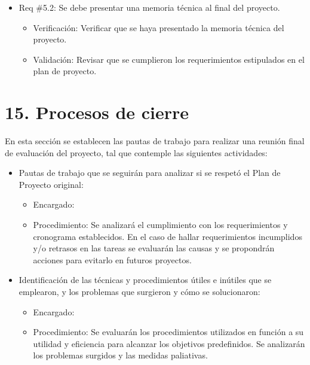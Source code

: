 \documentclass[
11pt, %
]{charter}
\begin{document}
\begin{itemize} 
\item Req \#5.2: Se debe presentar una memoria técnica al final del proyecto.
\begin{itemize}
	\item Verificación: Verificar que se haya presentado la memoria técnica del proyecto.
	\item Validación: Revisar que se cumplieron los requerimientos estipulados en el plan de proyecto.
\end{itemize}
\end{itemize}


\section{15. Procesos de cierre}    
\label{sec:cierre}
En esta sección se establecen las pautas de trabajo para realizar una reunión final de evaluación del proyecto, tal que contemple las siguientes actividades:

\begin{itemize}
	\item Pautas de trabajo que se seguirán para analizar si se respetó el Plan de Proyecto original:\\
    \begin{itemize}
        \item Encargado: \authorname
        \item Procedimiento: Se analizará el cumplimiento con los requerimientos y cronograma establecidos. En el caso de hallar requerimientos incumplidos y/o retrasos en las tareas se evaluarán las causas y se propondrán acciones para evitarlo en futuros proyectos.
    \end{itemize}
\end{itemize}

\begin{itemize}
	\item Identificación de las técnicas y procedimientos útiles e inútiles que se emplearon, y los problemas que surgieron y cómo se solucionaron:\\
    \begin{itemize}
        \item Encargado: \authorname
        \item Procedimiento: Se evaluarán los procedimientos utilizados en función a su utilidad y eficiencia para alcanzar los objetivos predefinidos. Se analizarán los problemas surgidos y las medidas paliativas.
    \end{itemize}
\end{itemize}
\end{document}

